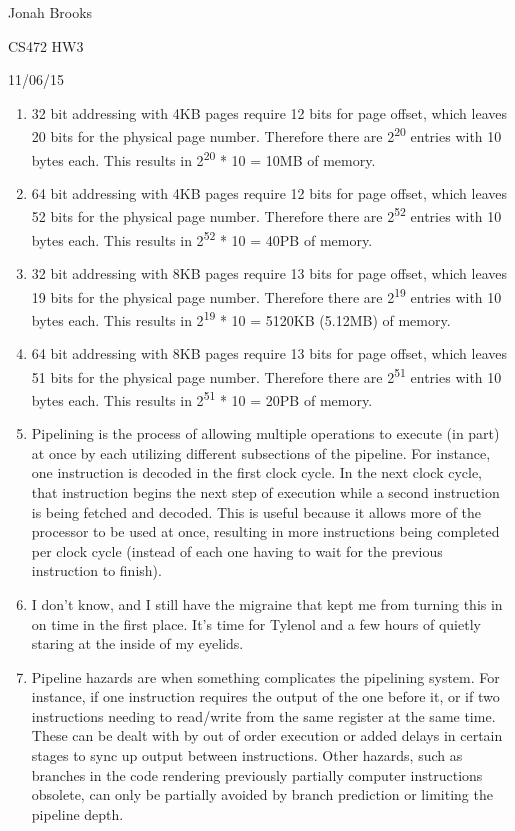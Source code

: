 \documentclass[letterpaper,10pt,titlepage]{article}
\begin{document}
Jonah Brooks

CS472 HW3

11/06/15

\begin{enumerate}
\item 
32 bit addressing with 4KB pages require 12 bits for page offset, which leaves
20 bits for the physical page number. Therefore there are 2\textsuperscript{20} entries with 10 bytes
each. This results in 2\textsuperscript{20} * 10 = 10MB of memory.  

\item 
64 bit addressing with 4KB pages require 12 bits for page offset, which leaves
52 bits for the physical page number. Therefore there are 2\textsuperscript{52} entries with 10 bytes
each. This results in 2\textsuperscript{52} * 10 = 40PB of memory.  

\item 
32 bit addressing with 8KB pages require 13 bits for page offset, which leaves
19 bits for the physical page number. Therefore there are 2\textsuperscript{19} entries with 10 bytes
each. This results in 2\textsuperscript{19} * 10 = 5120KB (5.12MB) of memory.  

\item 
64 bit addressing with 8KB pages require 13 bits for page offset, which leaves
51 bits for the physical page number. Therefore there are 2\textsuperscript{51} entries with 10 bytes
each. This results in 2\textsuperscript{51} * 10 = 20PB of memory.  

\item 
Pipelining is the process of allowing multiple operations to execute (in part) at once by each
utilizing different subsections of the pipeline. For instance, one instruction is decoded in the first
clock cycle. In the next clock cycle, that instruction begins the next step of execution while a second
instruction is being fetched and decoded. This is useful because it allows more of the processor to be
used at once, resulting in more instructions being completed per clock cycle (instead of each one 
having to wait for the previous instruction to finish). 

\item
I don't know, and I still have the migraine that kept me from turning this in on time in the first place. 
It's time for Tylenol and a few hours of quietly staring at the inside of my eyelids. 

\item
Pipeline hazards are when something complicates the pipelining system. For instance, if one instruction
requires the output of the one before it, or if two instructions needing to read/write from the same
register at the same time. These can be dealt with by out of order execution or added delays in certain
stages to sync up output between instructions. Other hazards, such as branches in the code rendering
previously partially computer instructions obsolete, can only be partially avoided by branch prediction
or limiting the pipeline depth. 
\end{enumerate}
\end{document}
